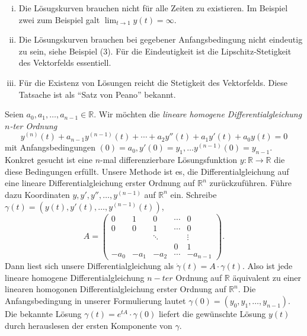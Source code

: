 \documentclass[../main.tex]{subfiles}
\begin{document}
\begin{remarks}
   \leavevmode
   \begin{enumerate}[(i)]
   \item Die Lösugskurven brauchen nicht für alle Zeiten zu existieren.
     Im Beispiel zwei zum Beispiel galt $\lim_{t \to 1} y(t) = \infty$.
   \item Die Lösungskurven brauchen bei gegebener Anfangsbedingung nicht
     eindeutig zu sein, siehe Beispiel (3). Für die
     Eindeutigkeit ist die Lipschitz-Stetigkeit des
     Vektorfelds essentiell.
   \item Für die Existenz von Lösungen reicht
     die Stetigkeit des Vektorfelds. Diese Tatsache
     ist als ``Satz von Peano'' bekannt.
 \end{enumerate}
\end{remarks}

Seien $a_0, a_1, \dots, a_{n-1} \in \mathbb{R}$.
Wir möchten die 
\emph{lineare homogene Differentialgleichung $n$-ter Ordnung}
\[
  y^{(n)}(t) 
  + a_{n-1}y^{(n-1)}(t) 
  + \cdots 
  + a_2 y''(t) 
  + a_1 y'(t) 
  + a_0 y(t) 
  = 0
\]
mit Anfangsbedingungen $(0) = a_0, y'(0) = y_1, \dots
y^{(n-1)}(0) = y_{n-1}$.
Konkret gesucht ist eine $n$-mal differenzierbare
Lösungsfunktion $y \colon \mathbb{R} \to \mathbb{R}$ 
die diese Bedingungen erfüllt.
Unsere Methode ist es, die Differentialgleichung auf eine
lineare Differentialgleichung erster Ordnung auf $\mathbb{R}^n$ 
zurückzuführen.
Führe dazu Koordinaten
$y, y', y'', \dots, y^{(n-1)}$ auf $\mathbb{R}^n$ ein.
Schreibe
$\gamma(t) = (y(t), y'(t), \dots, y^{(n-1)}(t))$,
\[
  A =
  \begin{pmatrix}
    0 & 1 & 0 & \cdots & 0 \\
    0 & 0 & 1 & \cdots & 0 \\
      &   & \ddots & & \vdots \\
      & & &  0 & 1 \\
    -a_0 & -a_1 & -a_2 & \cdots & -a_{n-1}
  \end{pmatrix}.
\]
Dann liest sich unsere Differentialgleichung als
$\dot \gamma(t) = A \cdot \gamma(t)$.
Also ist jede lineare homogene Differentialgleichung
$n-ter$ Ordnung auf $\mathbb{R}$ äquivalent zu einer linearen
homogonen Differentialgleichung erster Ordnung auf $\mathbb{R}^n$.
Die Anfangsbedingung in unserer Formulierung lautet
$\gamma(0) = (y_0, y_1, \dots, y_{n-1})$.
Die bekannte Lösung $\gamma(t) = e^{tA} \cdot \gamma(0)$ 
liefert die gewünschte Lösung $y(t)$ durch herauslesen
der ersten Komponente von $\gamma$.
\end{document}
